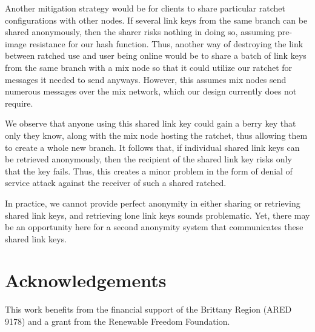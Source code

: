 \documentclass[twoside,letterpaper]{llncs}
\begin{document}
Another mitigation strategy would be for clients
to share particular ratchet configurations with other nodes.
If several link keys from the same branch can be shared anonymously,
then the sharer risks nothing in doing so, assuming pre-image
resistance for our hash function.  Thus, another way of destroying the
link between ratched use and user being online would be to share a
batch of link keys from the same branch with a mix node so that it
could utilize our ratchet for messages it needed to send anyways.
However, this assumes mix nodes send numerous messages over the mix
network, which our design currently does not require.

We observe that anyone using this shared link key could gain a berry
key that only they know, along with the mix node hosting the ratchet,
thus allowing them to create a whole new branch.  It follows that,
if individual shared link keys can be retrieved anonymously, then
the recipient of the shared link key risks only that the key fails.
Thus, this creates a minor problem in the form of denial of service
attack against the receiver of such a shared ratched.

In practice, we cannot provide perfect anonymity in either sharing or
retrieving shared link keys, and retrieving lone link keys sounds
problematic.  Yet, there may be an opportunity here for a second
anonymity system that communicates these shared link keys.


\section*{Acknowledgements}

This work benefits from the financial support of the Brittany Region
(ARED 9178) and a grant from the Renewable Freedom Foundation.




\end{document}
